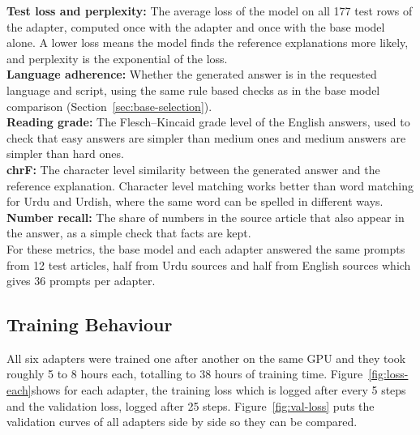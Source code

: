 \documentclass{FastFyp}
\begin{document}
\textbf{Test loss and perplexity:} The average loss of the model on all 177 test rows of the adapter, computed once with the adapter and once with the base model alone. A lower loss means the model finds the reference explanations more likely, and perplexity is the exponential of the loss.\\
\textbf{Language adherence:} Whether the generated answer is in the requested language and script, using the same rule based checks as in the base model comparison (Section~\ref{sec:base-selection}).\\
\textbf{Reading grade:} The Flesch--Kincaid grade level of the English answers, used to check that easy answers are simpler than medium ones and medium answers are simpler than hard ones.\\
\textbf{chrF:} The character level similarity between the generated answer and the reference explanation. Character level matching works better than word matching for Urdu and Urdish, where the same word can be spelled in different ways.\\
\textbf{Number recall:} The share of numbers in the source article that also appear in the answer, as a simple check that facts are kept.\\

For these metrics, the base model and each adapter answered the same prompts from 12 test articles, half from Urdu sources and half from English sources which gives 36 prompts per adapter.

\subsection{Training Behaviour}
All six adapters were trained one after another on the same GPU and they took roughly 5 to 8 hours each, totalling to 38 hours of training time. Figure~\ref{fig:loss-each}shows for each adapter, the training loss which is logged after every 5 steps and the validation loss, logged after 25 steps. Figure~\ref{fig:val-loss} puts the validation curves of all adapters side by side so they can be compared.
\end{document}
